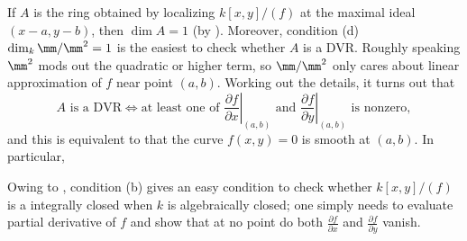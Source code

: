 \begin{remark}
    If $A$ is the ring obtained by localizing $k[x,y]/(f)$
    at the maximal ideal $(x-a,y-b)$,
    then $\dim A = 1$ (by ).
    Moreover, condition (d) $\dim_k \mm / \mm^2 = 1$ is the easiest
    to check whether $A$ is a DVR.
    Roughly speaking $\mm^2$ mods out the quadratic or higher term,
    so $\mm/\mm^2$ only cares about linear approximation
    of $f$ near point $(a,b)$. 
    Working out the details, it turns out that 
    $$A\text{ is a DVR} \iff \text{at least one of }
    \left.\frac{\partial f}{\partial x}\right|_{(a,b)}
    \text{ and } \left.\frac{\partial f}{\partial y}\right|_{(a,b)}
    \text{ is nonzero},$$
    and this is equivalent to that the curve $f(x,y)=0$
    is smooth at $(a,b)$. In particular,
    \begin{center}
    \end{center}
    
    Owing to , 
    condition (b) gives an easy condition to check
    whether $k[x,y]/(f)$ is a integrally closed
    when $k$ is algebraically closed;
    one simply needs to evaluate partial derivative 
    of $f$ and show that at no point do both
    $\tfrac{\partial f}{\partial x}$ and $\tfrac{\partial f}{\partial y}$ vanish.
\end{remark}

